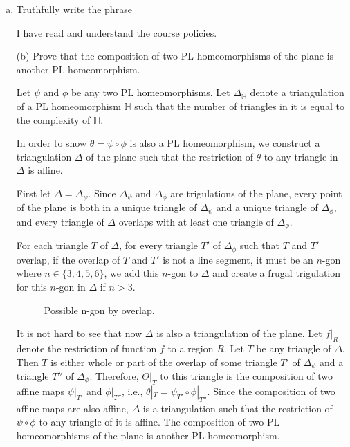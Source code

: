 \documentclass[11pt]{article}
\begin{document}
\begin{enumerate}[(a)]\itemsep0pt
  \item
    Truthfully write the phrase 

\begin{solution}
  I have read and understand the course policies.
\end{solution}

  \item[(b)]
    Prove that the composition of two PL homeomorphisms of the plane is another PL homeomorphism.

\begin{solution}
  Let \(\psi\) and \(\phi\) be any two PL homeomorphisms.
  Let \(\Delta_{\mathbb{H}}\) denote a triangulation of a PL homeomorphism \(\mathbb{H}\) such that the number of triangles in it is equal to the complexity of \(\mathbb{H}\).

  In order to show \(\theta=\psi\circ\phi\) is also a PL homeomorphism, we construct a triangulation \(\Delta\) of the plane such that the restriction of \(\theta\) to any triangle in \(\Delta\) is affine.

  First let \(\Delta=\Delta_{\psi}\).
  Since \(\Delta_{\psi}\) and \(\Delta_{\phi}\) are trigulations of the plane, every point of the plane is both in a unique triangle of \(\Delta_{\psi}\) and a unique triangle of \(\Delta_{\phi}\), and every triangle of \(\Delta\) overlaps with at least one triangle of \(\Delta_{\phi}\).

  For each triangle \(T\) of \(\Delta\), for every triangle \(T'\) of \(\Delta_{\phi}\) such that \(T\) and \(T'\) overlap, if the overlap of \(T\) and \(T'\) is not a line segment, it must be an \(n\)-gon where \(n\in\{3,4,5,6\}\), we add this \(n\)-gon to \(\Delta\) and create a frugal trigulation for this \(n\)-gon in \(\Delta\) if \(n>3\).

\begin{figure}[h]
  \centering
  
  \caption{Possible n-gon by overlap.}
\end{figure}

  It is not hard to see that now \(\Delta\) is also a triangulation of the plane. Let \(f|_{R}\) denote the restriction of function \(f\) to a region \(R\). Let \(T\) be any triangle of \(\Delta\).
  Then \(T\) is either whole or part of the overlap of some triangle \(T'\) of \(\Delta_{\psi}\) and a triangle \(T''\) of \(\Delta_{\phi}\).
  Therefore, \(\Theta|_{T}\) to this triangle is the composition of two affine maps \(\psi|_{T'}\) and \(\phi|_{T''}\), i.e., \(\theta|_{T}=\psi_{T'}\circ \phi|_{T''}\).
  Since the composition of two affine maps are also affine, \(\Delta\) is a triangulation such that the restriction of \(\psi\circ \phi\) to any triangle of it is affine.
  The composition of two PL homeomorphisms of the plane is another PL homeomorphism.


\end{solution}
\end{enumerate}
\end{document}
